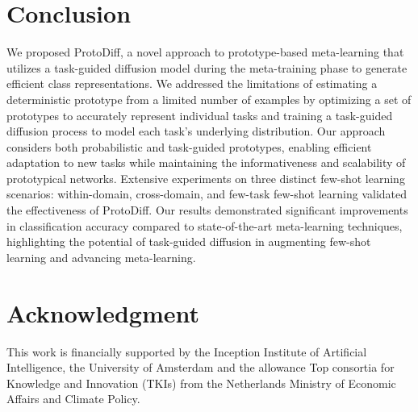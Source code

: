
\section{Conclusion}
We proposed ProtoDiff, a novel approach to prototype-based meta-learning that utilizes a task-guided diffusion model during the meta-training phase to generate efficient class representations. We addressed the limitations of estimating a deterministic prototype from a limited number of examples by optimizing a set of prototypes to accurately represent individual tasks and training a task-guided diffusion process to model each task's underlying distribution. Our approach considers both probabilistic and task-guided prototypes, enabling efficient adaptation to new tasks while maintaining the informativeness and scalability of prototypical networks. Extensive experiments on three distinct few-shot learning scenarios: within-domain, cross-domain, and few-task few-shot learning validated the effectiveness of ProtoDiff. Our results demonstrated significant improvements in classification accuracy compared to state-of-the-art meta-learning techniques, highlighting the potential of task-guided diffusion in augmenting few-shot learning and advancing meta-learning.


\section*{Acknowledgment}
This work is financially supported by the Inception Institute of Artificial Intelligence, the University of Amsterdam and the allowance 
Top consortia for Knowledge and Innovation (TKIs) from the Netherlands Ministry of Economic Affairs and Climate Policy.
